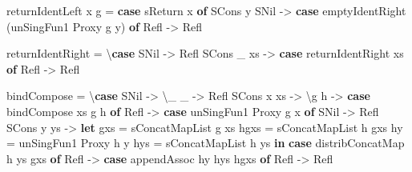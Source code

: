 \documentclass[]{article}
\newenvironment{Shaded}{}{}
\newcommand{\KeywordTok}[1]{\textcolor[rgb]{0.00,0.44,0.13}{\textbf{{#1}}}}
\newcommand{\DataTypeTok}[1]{\textcolor[rgb]{0.56,0.13,0.00}{{#1}}}
\newcommand{\OtherTok}[1]{\textcolor[rgb]{0.00,0.44,0.13}{{#1}}}
\newcommand{\FunctionTok}[1]{\textcolor[rgb]{0.02,0.16,0.49}{{#1}}}
\newcommand{\NormalTok}[1]{{#1}}
\begin{document}
\begin{Shaded}
\begin{Highlighting}[]
    \NormalTok{returnIdentLeft x g }\FunctionTok{=} \KeywordTok{case} \NormalTok{sReturn x }\KeywordTok{of}
      \DataTypeTok{SCons} \NormalTok{y }\DataTypeTok{SNil} \OtherTok{->} \KeywordTok{case} \NormalTok{emptyIdentRight (unSingFun1 }\DataTypeTok{Proxy} \NormalTok{g y) }\KeywordTok{of}
        \DataTypeTok{Refl} \OtherTok{->} \DataTypeTok{Refl}

    \NormalTok{returnIdentRight }\FunctionTok{=} \NormalTok{\textbackslash{}}\KeywordTok{case}
      \DataTypeTok{SNil}       \OtherTok{->} \DataTypeTok{Refl}
      \DataTypeTok{SCons} \NormalTok{_ xs }\OtherTok{->} \KeywordTok{case} \NormalTok{returnIdentRight xs }\KeywordTok{of}
        \DataTypeTok{Refl} \OtherTok{->} \DataTypeTok{Refl}

    \NormalTok{bindCompose }\FunctionTok{=} \NormalTok{\textbackslash{}}\KeywordTok{case}
      \DataTypeTok{SNil}       \OtherTok{->} \NormalTok{\textbackslash{}_ _ }\OtherTok{->} \DataTypeTok{Refl}
      \DataTypeTok{SCons} \NormalTok{x xs }\OtherTok{->} \NormalTok{\textbackslash{}g h }\OtherTok{->} \KeywordTok{case} \NormalTok{bindCompose xs g h }\KeywordTok{of}
        \DataTypeTok{Refl} \OtherTok{->} \KeywordTok{case} \NormalTok{unSingFun1 }\DataTypeTok{Proxy} \NormalTok{g x }\KeywordTok{of}
          \DataTypeTok{SNil}       \OtherTok{->} \DataTypeTok{Refl}
          \DataTypeTok{SCons} \NormalTok{y ys }\OtherTok{->}
            \KeywordTok{let} \NormalTok{gxs  }\FunctionTok{=} \NormalTok{sConcatMapList g xs}
                \NormalTok{hgxs }\FunctionTok{=} \NormalTok{sConcatMapList h gxs}
                \NormalTok{hy   }\FunctionTok{=} \NormalTok{unSingFun1 }\DataTypeTok{Proxy} \NormalTok{h y}
                \NormalTok{hys  }\FunctionTok{=} \NormalTok{sConcatMapList h ys}
            \KeywordTok{in}  \KeywordTok{case} \NormalTok{distribConcatMap h ys gxs }\KeywordTok{of}
                  \DataTypeTok{Refl} \OtherTok{->} \KeywordTok{case} \NormalTok{appendAssoc hy hys hgxs }\KeywordTok{of}
                    \DataTypeTok{Refl} \OtherTok{->} \DataTypeTok{Refl}


\end{Highlighting}
\end{Shaded}
\end{document}
